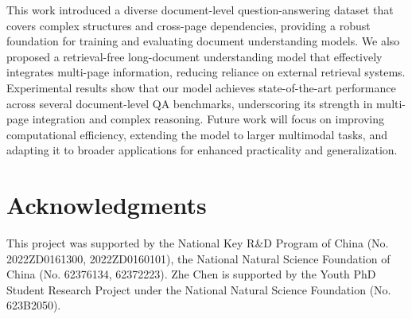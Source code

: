 \documentclass[10pt,twocolumn,letterpaper]{article}
\begin{document}
\begin{CJK}{UTF8}{gbsn}
This work introduced a diverse document-level question-answering dataset that covers complex structures and cross-page dependencies, providing a robust foundation for training and evaluating document understanding models. We also proposed a retrieval-free long-document understanding model that effectively integrates multi-page information, reducing reliance on external retrieval systems. Experimental results show that our model achieves state-of-the-art performance across several document-level QA benchmarks, underscoring its strength in multi-page integration and complex reasoning. Future work will focus on improving computational efficiency, extending the model to larger multimodal tasks, and adapting it to broader applications for enhanced practicality and generalization.

\section*{Acknowledgments}
This project was supported by the National Key R\&D Program of China (No. 2022ZD0161300, 2022ZD0160101), the National Natural Science Foundation of China (No. 62376134, 62372223). Zhe Chen is supported by the Youth PhD Student Research Project under the National Natural Science Foundation (No. 623B2050).

{
    \small
    
    
}



\end{CJK}
\end{document}
